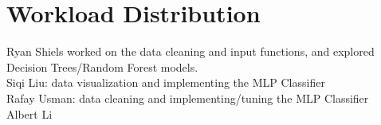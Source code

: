 \documentclass[journal]{IEEEtran}
\begin{document}
\section{Workload Distribution}

Ryan Shiels worked on the data cleaning and input functions, and explored Decision Trees/Random Forest models.\\
Siqi Liu: data visualization and implementing the MLP Classifier\\
Rafay Usman: data cleaning and implementing/tuning the MLP Classifier\\
Albert Li\\
\end{document}
